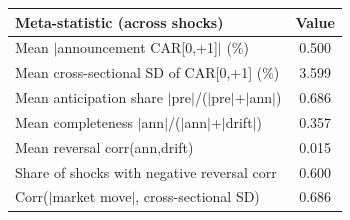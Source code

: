 \begin{tabular}{lc}
\toprule
Meta-statistic (across shocks) & Value \\
\midrule
Mean $|$announcement CAR[0,+1]$|$ (\%) & 0.500 \\
Mean cross-sectional SD of CAR[0,+1] (\%) & 3.599 \\
Mean anticipation share $|$pre$|$/($|$pre$|$+$|$ann$|$) & 0.686 \\
Mean completeness $|$ann$|$/($|$ann$|$+$|$drift$|$) & 0.357 \\
Mean reversal corr(ann,drift) & 0.015 \\
Share of shocks with negative reversal corr & 0.600 \\
Corr($|$market move$|$, cross-sectional SD) & 0.686 \\
\bottomrule
\end{tabular}